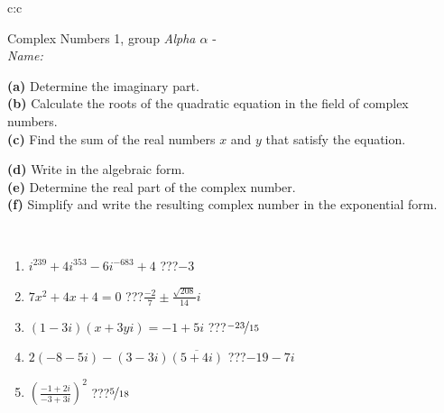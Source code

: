 \documentclass[10pt]{report}
\begin{document}
\thispagestyle{empty}
\begin{tabular}{c:c}
\begin{minipage}[c][104.5mm][t]{0.5\linewidth}
\begin{center}
\vspace{5mm}
{\huge Complex Numbers 1, group \textit{Alpha $\alpha$} -}\\[5mm]
\textit{Name:}\phantom{xxxxxxxxxxxxxxxxxxxxxxxxxxxxxxxxxxxxxxxxxxxxxxxxxxxxxxxxxxxxxxxxx}\\[5mm]
\begin{minipage}{0.95\linewidth}
\begin{center}
{\small \begin{minipage}{0.44\textwidth} \raggedright
\textbf{(a)} Determine the imaginary part. \\[1mm]
\textbf{(b)} Calculate the roots of the quadratic equation in the field of complex numbers. \\[1mm]
\textbf{(c)} Find the sum of the real numbers \(x\) and \(y\) that satisfy the equation. \end{minipage} \begin{minipage}{0.54\textwidth}
\textbf{(d)} Write in the algebraic form. \\[1mm]
\textbf{(e)} Determine the real part of the complex number. \\[1mm]
\textbf{(f)} Simplify and write the resulting complex number in the exponential form.
\end{minipage}
} \vspace{3mm}
\end{center}
\end{minipage}
\\[1mm]
\begin{minipage}{0.79\linewidth}
\begin{center}
\begin{varwidth}{\linewidth}
\setlength{\itemsep}{0pt}
\begin{enumerate}
\large
\item $i^{239}+4i^{353}-6i^{-683}+4$\quad \dotfill\; ???\;\dotfill \quad $-3$
\item $7x^2+4x+4=0$\quad \dotfill\; ???\;\dotfill \quad $\frac{-2}{7} \pm{}\frac{ \sqrt{208}}{14}i$
\item $(1-3i)(x+3yi)=-1+5i$\quad \dotfill\; ???\;\dotfill \quad $\nicefrac{-23}{15}$
\item $2(-8-5i)-(3-3i)\overline{(5+4i)}$\quad \dotfill\; ???\;\dotfill \quad $-19-7i$
\item $\left(\frac{-1+2i}{-3+3i}\right)^2$\quad \dotfill\; ???\;\dotfill \quad $\nicefrac{5}{18}$

\end{enumerate}
\end{varwidth}
\end{center}
\end{minipage}
\end{center}
\end{minipage}
\end{tabular}
\end{document}
